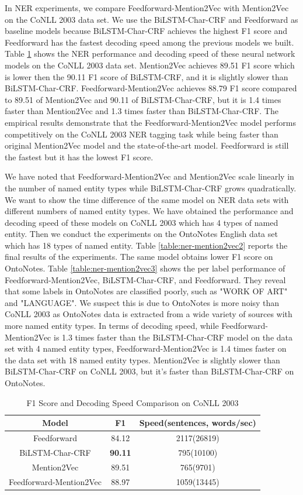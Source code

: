 In NER experiments, we compare Feedforward-Mention2Vec with Mention2Vec on the CoNLL 2003 data set. We use the BiLSTM-Char-CRF and Feedforward as baseline models because BiLSTM-Char-CRF achieves the highest F1 score and Feedforward has the fastest decoding speed among the previous models we built. Table \ref{table:ner-mention2vec1} shows the NER performance and decoding speed of these neural network models on the CoNLL 2003 data set. Mention2Vec achieves 89.51 F1 score which is lower then the 90.11 F1 score of BiLSTM-CRF, and it is slightly slower than BiLSTM-Char-CRF. Feedforward-Mention2Vec achieves 88.79 F1 score compared to 89.51 of Mention2Vec and 90.11 of BiLSTM-Char-CRF, but it is 1.4 times faster than Mention2Vec and 1.3 times faster than BiLSTM-Char-CRF. The empirical results demonstrate that the Feedforward-Mention2Vec model performs competitively on the CoNLL 2003 NER tagging task while being faster than original Mention2Vec model and the state-of-the-art model. Feedforward is still the fastest but it has the lowest F1 score.

We have noted that Feedforward-Mention2Vec and Mention2Vec scale linearly in the number of named entity types while BiLSTM-Char-CRF grows quadratically. We want to show the time difference of the same model on NER data sets with different numbers of named entity types. We have obtained the performance and decoding speed of these models on CoNLL 2003 which has 4 types of named entity. Then we conduct the experiments on the OntoNotes English data set which has 18 types of named entity. Table \ref{table:ner-mention2vec2} reports the final results of the experiments. The same model obtains lower F1 score on OntoNotes. Table \ref{table:ner-mention2vec3} shows the per label performance of Feedforward-Mention2Vec, BiLSTM-Char-CRF, and Feedforward. They reveal that some labels in OntoNotes are classified poorly, such as "WORK OF ART" and "LANGUAGE". We suspect this is due to OntoNotes is more noisy than CoNLL 2003 as OntoNotes data is extracted from a wide variety of sources with more named entity types. In terms of decoding speed, while Feedforward-Mention2Vec is 1.3 times faster than the BiLSTM-Char-CRF model on the data set with 4 named entity types, Feedforward-Mention2Vec is 1.4 times faster on the data set with 18 named entity types. Mention2Vec is slightly slower than BiLSTM-Char-CRF on CoNLL 2003, but it's faster than BiLSTM-Char-CRF on OntoNotes.

\begin{table}[]
\centering
\caption{F1 Score and Decoding Speed Comparison on CoNLL 2003}
\label{table:ner-mention2vec1}
\begin{tabular}{|c|c|c|}
\hline
Model   & F1     & Speed(sentences, words/sec)      \\ \hline
Feedforward      & 84.12  & 2117(26819) \\ \hline
BiLSTM-Char-CRF & \textbf{90.11}  & 795(10100)      \\ \hline
Mention2Vec  & 89.51     & 765(9701)              \\ \hline
Feedforward-Mention2Vec  & 88.97  &  1059(13445)                   \\ \hline
\end{tabular}
\end{table}

